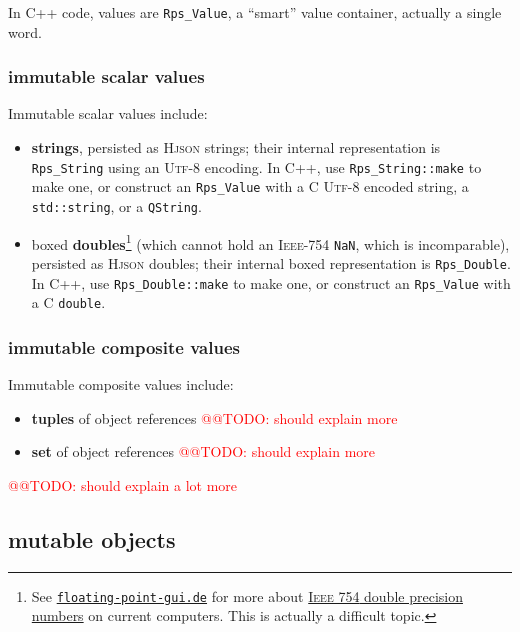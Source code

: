 \documentclass[11pt,a4paper,svgnames]{article}
\begin{document}
In C++ code, values are \texttt{Rps\_Value}, a ``smart'' value container, actually a single word.

\subsubsection{immutable scalar values}
\label{subsubsec:immutable-scalar}

Immutable scalar values include:
\begin{itemize}
  \item \textbf{strings},  persisted as \textsc{Hjson} strings; their internal
    representation is \texttt{Rps\_String} using an \textsc{Utf-8}
    encoding. In C++, use \texttt{Rps\_String::make} to make one, or
    construct an \texttt{Rps\_Value} with a C \textsc{Utf-8} encoded
    string, a \texttt{std::string}, or a \texttt{QString}.
    \item boxed \textbf{doubles}\footnote{See
    \href{http://floating-point-gui.de}{\texttt{floating-point-gui.de}}
      for more about
      \href{https://en.wikipedia.org/wiki/IEEE\_754}{\textsc{Ieee 754}
        double precision numbers} on current computers. This is
      actually a difficult topic.} (which cannot hold an
    \textsc{Ieee-754} \texttt{NaN}, which is incomparable), persisted
    as \textsc{Hjson} doubles; their internal boxed representation is
    \texttt{Rps\_Double}. In C++, use \texttt{Rps\_Double::make} to make one, or
    construct an \texttt{Rps\_Value} with a C \texttt{double}.
\end{itemize}

\subsubsection{immutable composite values}
\label{subsubsec:immutable-composite}

Immutable composite values include:
\begin{itemize}
\item \textbf{tuples} of object references \textcolor{red}{@@TODO: should explain more}
\item \textbf{set} of object references \textcolor{red}{@@TODO: should explain more}
\end{itemize}
\textcolor{red}{@@TODO: should explain a lot more}

\subsection{mutable objects}
\label{subsec:mutable-objects}
\end{document}
